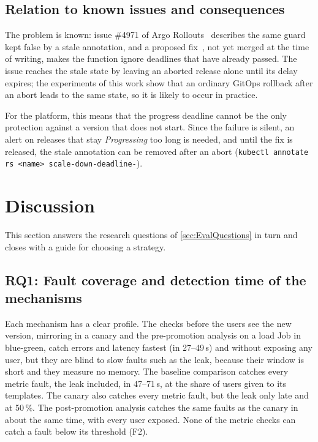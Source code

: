 \subsection{Relation to known issues and consequences}
\label{sec:EvalDeadlineKnown}
The problem is known: issue \#4971 of Argo Rollouts~\cite{ArgoRolloutsIssue4971} describes the same guard kept false by a stale annotation, and a proposed fix~\cite{ArgoRolloutsPR4972}, not yet merged at the time of writing, makes the function ignore deadlines that have already passed. The issue reaches the stale state by leaving an aborted release alone until its delay expires; the experiments of this work show that an ordinary GitOps rollback after an abort leads to the same state, so it is likely to occur in practice.

For the platform, this means that the progress deadline cannot be the only protection against a version that does not start. Since the failure is silent, an alert on releases that stay \emph{Progressing} too long is needed, and until the fix is released, the stale annotation can be removed after an abort (\texttt{kubectl annotate rs <name> scale-down-deadline-}).

\section{Discussion}
\label{sec:EvalDiscussion}
This section answers the research questions of \autoref{sec:EvalQuestions} in turn and closes with a guide for choosing a strategy.

\subsection{RQ1: Fault coverage and detection time of the mechanisms}
\label{sec:EvalRQ1}
Each mechanism has a clear profile. The checks before the users see the new version, mirroring in a canary and the pre-promotion analysis on a load Job in blue-green, catch errors and latency fastest (in 27--49\,s) and without exposing any user, but they are blind to slow faults such as the leak, because their window is short and they measure no memory. The baseline comparison catches every metric fault, the leak included, in 47--71\,s, at the share of users given to its templates. The canary also catches every metric fault, but the leak only late and at 50\,\%. The post-promotion analysis catches the same faults as the canary in about the same time, with every user exposed. None of the metric checks can catch a fault below its threshold (F2).

